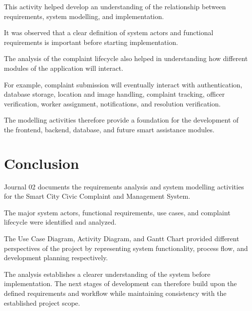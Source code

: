 \documentclass[12pt,a4paper]{article}
\begin{document}
This activity helped develop an understanding of the relationship between requirements, system modelling, and implementation.

It was observed that a clear definition of system actors and functional requirements is important before starting implementation.

The analysis of the complaint lifecycle also helped in understanding how different modules of the application will interact.

For example, complaint submission will eventually interact with authentication, database storage, location and image handling, complaint tracking, officer verification, worker assignment, notifications, and resolution verification.

The modelling activities therefore provide a foundation for the development of the frontend, backend, database, and future smart assistance modules.


\section{Conclusion}

Journal 02 documents the requirements analysis and system modelling activities for the Smart City Civic Complaint and Management System.

The major system actors, functional requirements, use cases, and complaint lifecycle were identified and analyzed.

The Use Case Diagram, Activity Diagram, and Gantt Chart provided different perspectives of the project by representing system functionality, process flow, and development planning respectively.

The analysis establishes a clearer understanding of the system before implementation. The next stages of development can therefore build upon the defined requirements and workflow while maintaining consistency with the established project scope.
\end{document}
